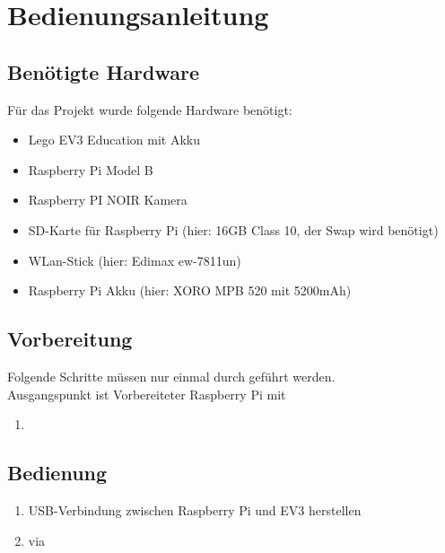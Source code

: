 \section{Bedienungsanleitung}
\subsection{Benötigte Hardware}
Für das Projekt wurde folgende Hardware benötigt:
\begin{itemize}
\item Lego EV3 Education mit Akku
\item Raspberry Pi Model B
\item Raspberry PI NOIR Kamera
\item SD-Karte für Raspberry Pi (hier: 16GB Class 10, der Swap wird benötigt)
\item WLan-Stick (hier: Edimax ew-7811un)
\item Raspberry Pi Akku (hier: XORO MPB 520 mit 5200mAh)
\end{itemize}
\subsection{Vorbereitung}
Folgende Schritte müssen nur einmal durch geführt werden.\\
Ausgangspunkt ist Vorbereiteter Raspberry Pi mit
\begin{enumerate}
\item 
\end{enumerate}
\subsection{Bedienung}
\begin{enumerate}
\item USB-Verbindung zwischen Raspberry Pi und EV3 herstellen
\item via 
\end{enumerate}